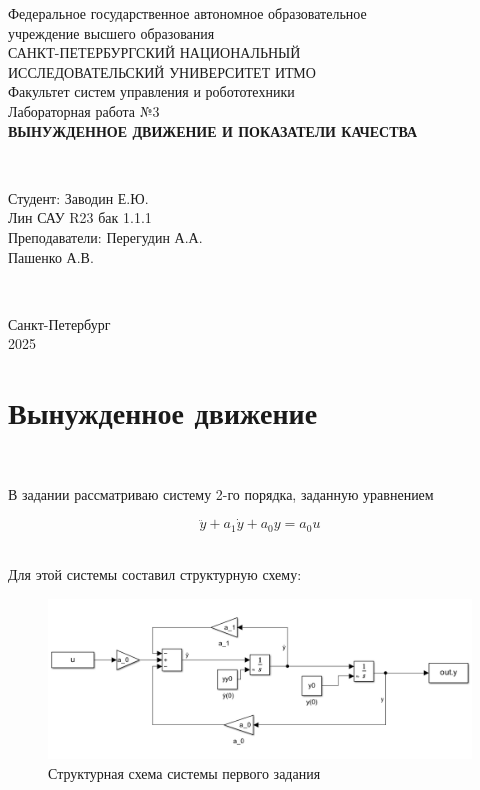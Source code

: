 \documentclass[a4paper]{article}
\begin{document}
\begin{titlepage}
    \begin{center}
        Федеральное государственное автономное образовательное \\ учреждение высшего образования \\[6pt]
        САНКТ-ПЕТЕРБУРГСКИЙ НАЦИОНАЛЬНЫЙ \\ ИССЛЕДОВАТЕЛЬСКИЙ УНИВЕРСИТЕТ ИТМО \\[16pt]
        Факультет систем управления и робототехники \\[26em]
        Лабораторная работа №3\\[0.5em]
        \textbf{ВЫНУЖДЕННОЕ ДВИЖЕНИЕ И ПОКАЗАТЕЛИ КАЧЕСТВА}
    \end{center}\,\\[10em]
    \begin{flushright}
        Студент: Заводин Е.Ю.\\
        Лин САУ R23 бак 1.1.1 \\[0.5em]
        Преподаватели: Перегудин А.А.\\
        Пашенко А.В.
    \end{flushright}\,\\[6em]
    \begin{center}
        {\small Санкт-Петербург \\ 2025}
    \end{center}
\end{titlepage}
\setcounter{page}{2}
\tableofcontents\newpage

\section{Вынужденное движение}\

В задании рассматриваю систему 2-го порядка, заданную уравнением 

$$
\ddot{y}+a_1\dot{y} + a_0y=a_0 u
$$\

Для этой системы составил структурную схему:

\begin{figure}[H]
    \centering
    \includegraphics[width=0.75\linewidth]{ex1/scheme.png}
    \caption{Структурная схема системы первого задания}
\end{figure}\
\end{document}
